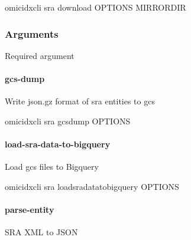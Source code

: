 \documentclass[letterpaper,10pt,english]{sphinxmanual}
\begin{document}
\begin{sphinxVerbatim}[commandchars=\\\{\}]
omicidx\PYGZhy{}cli sra download \PYG{o}{[}OPTIONS\PYG{o}{]} MIRRORDIR
\end{sphinxVerbatim}
\subsubsection*{Arguments}

\begin{fulllineitems}
\label{\detokenize{cli:cmdoption-omicidx-cli-sra-download-arg-mirrordir}}
Required argument

\end{fulllineitems}



\paragraph{gcs-dump}
\label{\detokenize{cli:omicidx-cli-sra-gcs-dump}}
Write json.gz format of sra entities to gcs

\begin{sphinxVerbatim}[commandchars=\\\{\}]
omicidx\PYGZhy{}cli sra gcs\PYGZhy{}dump \PYG{o}{[}OPTIONS\PYG{o}{]}
\end{sphinxVerbatim}


\paragraph{load-sra-data-to-bigquery}
\label{\detokenize{cli:omicidx-cli-sra-load-sra-data-to-bigquery}}
Load gcs files to Bigquery

\begin{sphinxVerbatim}[commandchars=\\\{\}]
omicidx\PYGZhy{}cli sra load\PYGZhy{}sra\PYGZhy{}data\PYGZhy{}to\PYGZhy{}bigquery \PYG{o}{[}OPTIONS\PYG{o}{]}
\end{sphinxVerbatim}


\paragraph{parse-entity}
\label{\detokenize{cli:omicidx-cli-sra-parse-entity}}
SRA XML to JSON
\end{document}

